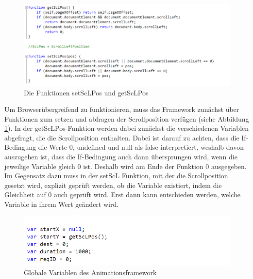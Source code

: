 \begin{figure} [h]
\includegraphics[width=\textwidth]{./img/js_get_set.png}
\caption{Die Funktionen setScLPos und getScLPos}
\label{js_get_set}
\end{figure}

Um Browserübergreifend zu funktionieren, muss das Framework zunächst über Funktionen zum setzen und abfragen der Scrollposition verfügen (siehe Abbildung \ref{js_get_set}). In der getScLPos-Funktion werden dabei zunächst die verschiedenen Variablen abgefragt, die die Scrollposition enthalten. Dabei ist darauf zu achten, dass die If-Bedingung die Werte 0, undefined und null als false interpretiert, weshalb davon auszugehen ist, dass die If-Bedingung auch dann übersprungen wird, wenn die jeweilige Variable gleich 0 ist. Deshalb wird am Ende der Funktion 0 ausgegeben. Im Gegensatz dazu muss in der setScL Funktion, mit der die Scrollposition gesetzt wird, explizit geprüft werden, ob die Variable existiert, indem die Gleichheit auf 0 auch geprüft wird. Erst dann kann entschieden werden, welche Variable in ihrem Wert geändert wird.
\begin{figure} [h]
\includegraphics[width=\textwidth]{./img/js_globals.png}
\caption{Globale Variablen des Animationsframework}
\label{js_globals}
\end{figure}
